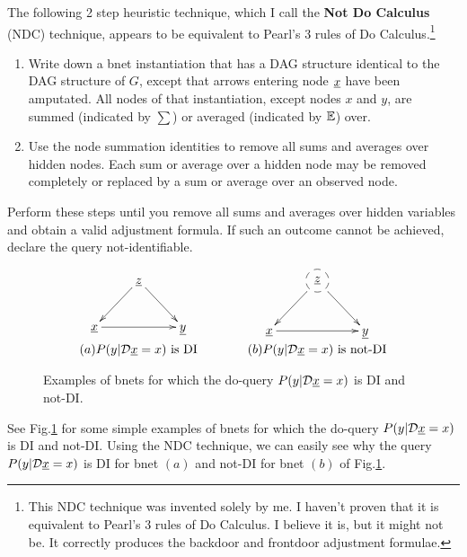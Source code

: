 The following 2 step heuristic technique,
which I call the {\bf Not Do Calculus} (NDC) technique, appears to be equivalent to Pearl's 3 rules of Do Calculus.\footnote{This NDC technique was invented solely by me. I haven't proven that it is equivalent to Pearl's 
3 rules of Do Calculus. I believe it is,
but it might not be. It 
correctly produces the backdoor and frontdoor adjustment formulae.}

\begin{mdframed}[hidealllines=true,backgroundcolor=blue!10]

\begin{enumerate}
\item 
Write down a bnet instantiation
that has a DAG structure identical
to the DAG structure of $G$,
except that arrows entering node
$\rvx$ have been amputated.
All nodes  of that instantiation, except
nodes  $x$ and $y$,
are summed (indicated by $\sum$) or averaged
(indicated by ${ \mathbb{E}}$) over.



\item Use the node summation identities to
remove all sums and averages over hidden nodes.
Each sum or average over a hidden node may be 
removed completely or replaced by a sum or average over an observed node. 
\end{enumerate}
Perform these steps until you remove all sums and averages  over hidden variables 
and obtain a valid adjustment formula.
If such an outcome cannot be achieved,
declare the  query not-identifiable.

\end{mdframed}


\begin{figure}[h!]
$$
\begin{array}{ccc}
\xymatrix{
&\rvz\ar[ld]\ar[rd]
\\
\rvx\ar[rr]&&\rvy
}
&\quad\quad&
\xymatrix{
&*++[F-o]{\rvz}\ar[ld]\ar[rd]
\\
\rvx\ar[rr]&&\rvy
}
\\
(a) \text{$P(y|\cald\rvx=x)$ is DI}
&&(b) \text{$P(y|\cald\rvx=x)$ is not-DI}
\end{array}
$$
\caption{Examples of
bnets for which
the do-query $P(y|\cald\rvx=x)$
is
DI
and not-DI.
}
\label{fig-iden-noniden}
\end{figure}
See Fig.\ref{fig-iden-noniden}
for some simple
examples of
bnets for which
the do-query $P(y|\cald\rvx=x)$
is
DI
and not-DI.
Using the NDC technique,
we can easily see why the
query $P(y|\cald\rvx=x)$
is DI
for bnet $(a)$ 
and not-DI for bnet $(b)$
of Fig.\ref{fig-iden-noniden}.

